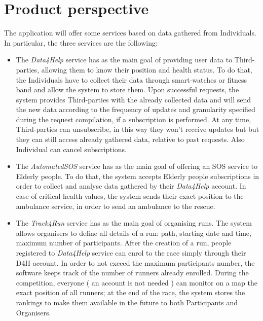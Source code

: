 \section{Product perspective}

The application will offer some services based on data gathered from Individuals. In particular, the three services are the following:

\begin{itemize}
    \item The \emph{Data4Help} service has as the main goal of providing user data to Third-parties, allowing them to know their position and health status.
    To do that, the Individuals have to collect their data through smart-watches or fitness band and allow the system to store them. Upon successful requests, the system provides Third-parties with the already collected data and will send the new data according to the frequency of updates and granularity specified during the request compilation, if a subscription is performed.
    At any time, Third-parties can unsubscribe, in this way they won't receive updates but but they can still access already gathered data, relative to past requests. Also Individual can cancel subscriptions.
    \item The \emph{AutomatedSOS} service has as the main goal of offering an SOS service to Elderly people. To do that, the system accepts Elderly people subscriptions in order to collect and analyse data gathered by their \emph{Data4Help} account. In case of critical health values, the system sends their exact position to the ambulance service, in order to send an ambulance to the rescue.
    \item The \emph{Track4Run} service has as the main goal of organising runs. The system allows organisers to define all details of a run: path, starting date and time, maximum number of participants. After the creation of a run, people registered to \emph{Data4Help} service can enrol to the race simply through their D4H account. In order to not exceed the maximum participants number, the software keeps track of the number of runners already enrolled. During the competition, everyone ( an account is not needed ) can monitor on a map the exact position of all runners; at the end of the race, the system stores the rankings to make them available in the future to both Participants and Organisers. 
\end{itemize}


